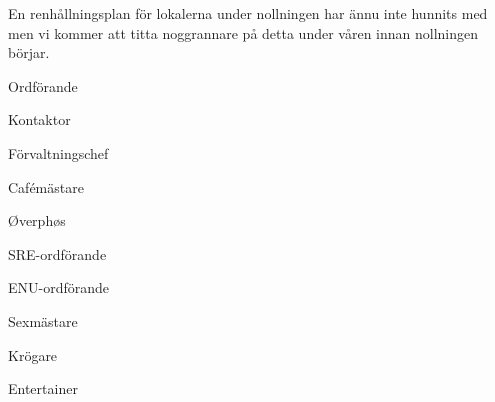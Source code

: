 \documentclass[../_main/handlingar.tex]{subfiles}
\begin{document}
En renhållningsplan för lokalerna under nollningen har ännu inte hunnits med men vi kommer att titta noggrannare på detta under våren innan nollningen börjar.

\newpage
\begin{signatures}{10}
    \mvh
    \signature{Fredrik Peterson}{Ordförande}
    \signature{Erik Månsson}{Kontaktor}
    \signature{Anders Nilsson}{Förvaltningschef}
    \signature{Stephanie Mirsky}{Cafémästare}
    \signature{Molly Rusk}{Øverphøs}
    \signature{Johan Persson}{SRE-ordförande}
    \signature{Johannes Koch}{ENU-ordförande}
    \signature{Martin Gemborn Nilsson}{Sexmästare}
    \signature{Malin Lindström}{Krögare}
    \signature{Dalia Khairallah}{Entertainer}
\end{signatures}
\end{document}
